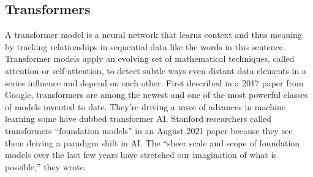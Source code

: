 
        \subsection*{Transformers}
        A transformer model is a neural network that learns context and thus meaning by tracking relationships in sequential data like the words in this sentence.
        Transformer models apply an evolving set of mathematical techniques, called attention or self-attention, to detect subtle ways even distant data elements in a series influence and depend on each other.
        First described in a 2017 paper from Google\cite{vaswani2023attention}, transformers are among the newest and one of the most powerful classes of models invented to date. They’re driving a wave of advances in machine learning some have dubbed transformer AI.
        Stanford researchers called transformers “foundation models” in an August 2021 paper\cite{bommasani2021opportunities} because they see them driving a paradigm shift in AI. The “sheer scale and scope of foundation models over the last few years have stretched our imagination of what is possible,” they wrote.


